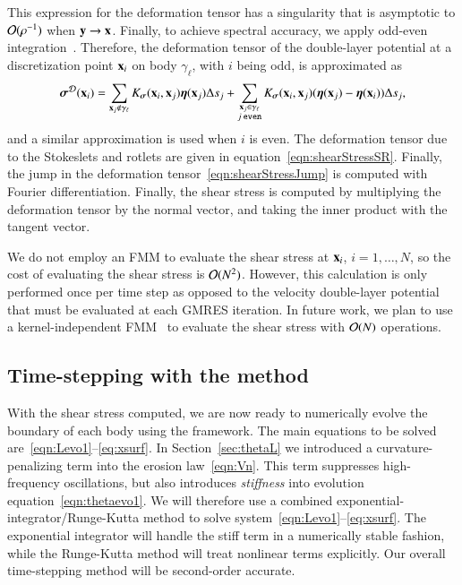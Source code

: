 \documentclass[preprint, 10pt]{elsarticle}
\begin{document}
This expression for the deformation tensor has a singularity that is
asymptotic to ${\mathcal{O}}(\rho^{-1})$ when ${\mathbf{y}} \rightarrow {\mathbf{x}}$.  Finally,
to achieve spectral accuracy, we apply odd-even
integration~\cite{sid-isr1988}.  Therefore, the deformation tensor of
the double-layer potential at a discretization point ${\mathbf{x}}_i$ on body
$\gamma_\ell$, with $i$ being odd, is approximated as
\begin{align}
  {\boldsymbol\sigma}^{{\mathcal{D}}}({\mathbf{x}}_i) = \sum_{{\mathbf{x}}_j \notin \gamma_\ell}
    K_{\boldsymbol\sigma}({\mathbf{x}}_i,{\mathbf{x}}_j) {\boldsymbol\eta}({\mathbf{x}}_j) \Delta s_j + 
  \sum_{\substack{{\mathbf{x}}_j \in \gamma_\ell \\ j \: \mathtt{even}}}
    K_{\boldsymbol\sigma}({\mathbf{x}}_i,{\mathbf{x}}_j) ({\boldsymbol\eta}({\mathbf{x}}_j) - {\boldsymbol\eta}({\mathbf{x}}_i)) \Delta s_j,
  \label{eqn:stressOddEven}
\end{align}
and a similar approximation is used when $i$ is even.  The deformation
tensor due to the Stokeslets and rotlets are given in
equation~\eqref{eqn:shearStressSR}.  Finally, the jump in the
deformation tensor~\eqref{eqn:shearStressJump} is computed with Fourier
differentiation.  Finally, the shear stress is computed by multiplying the
deformation tensor by the normal vector, and taking the inner product
with the tangent vector.

We do not employ an FMM to evaluate the shear stress at ${\mathbf{x}}_i$,
$i=1,\ldots,N$, so the cost of evaluating the shear stress is
${\mathcal{O}}(N^2)$.  However, this calculation is only performed once per time
step as opposed to the velocity double-layer potential that must be
evaluated at each GMRES iteration.  In future work, we plan to use a
kernel-independent FMM~\cite{yin-bir-zor2004} to evaluate the shear
stress with ${\mathcal{O}}(N)$ operations.

\subsection{Time-stepping with the {\thL} method} 
\label{sec:timeStepping}

With the shear stress computed, we are now ready to numerically evolve the boundary of each body using the {\thL} framework. The main equations to be solved are~\eqref{eqn:Levo1}--\eqref{eq:xsurf}.  In Section~\ref{sec:thetaL} we introduced a curvature-penalizing term into the erosion law~\eqref{eqn:Vn}. This term suppresses high-frequency oscillations, but also introduces {\em stiffness} into evolution equation~\eqref{eqn:thetaevo1}. We will therefore use a combined exponential-integrator/Runge-Kutta method to solve system~\eqref{eqn:Levo1}--\eqref{eq:xsurf}. The exponential integrator will handle the stiff term in a numerically stable fashion, while the Runge-Kutta method will treat nonlinear terms explicitly. Our overall time-stepping method will be second-order accurate.
\end{document}
